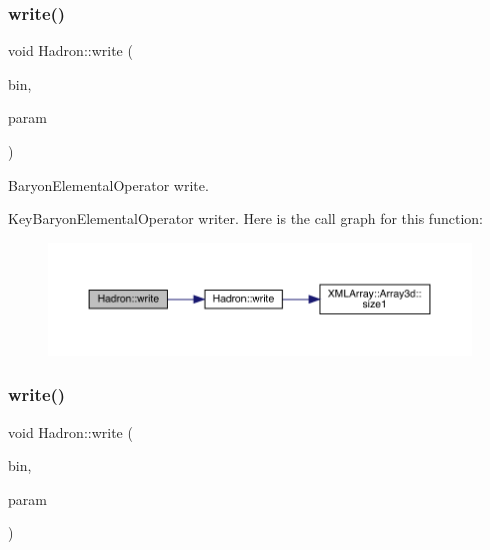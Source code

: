 \subsubsection{\texorpdfstring{write()}{write()}\hspace{0.1cm}{\footnotesize\ttfamily [43/95]}}
{\footnotesize\ttfamily void Hadron\+::write (\begin{DoxyParamCaption}\item[{\mbox{\hyperlink{classADATIO_1_1BinaryWriter}{Binary\+Writer}} \&}]{bin,  }\item[{const \mbox{\hyperlink{structHadron_1_1KeyBaryonElementalOperator__t}{Key\+Baryon\+Elemental\+Operator\+\_\+t}} \&}]{param }\end{DoxyParamCaption})}



Baryon\+Elemental\+Operator write. 

Key\+Baryon\+Elemental\+Operator writer. Here is the call graph for this function\+:\nopagebreak
\begin{figure}[H]
\begin{center}
\leavevmode
\includegraphics[width=350pt]{d1/daf/namespaceHadron_a4c0a824fa457c4fbaac034c83f5554c5_cgraph}
\end{center}
\end{figure}
\mbox{\label{namespaceHadron_a4330be9331eb4c839e7e123f5306560b}} 
\subsubsection{\texorpdfstring{write()}{write()}\hspace{0.1cm}{\footnotesize\ttfamily [44/95]}}
{\footnotesize\ttfamily void Hadron\+::write (\begin{DoxyParamCaption}\item[{\mbox{\hyperlink{classADATIO_1_1BinaryWriter}{Binary\+Writer}} \&}]{bin,  }\item[{const \mbox{\hyperlink{structHadron_1_1KeyParticleOp__t}{Key\+Particle\+Op\+\_\+t}} \&}]{param }\end{DoxyParamCaption})}



